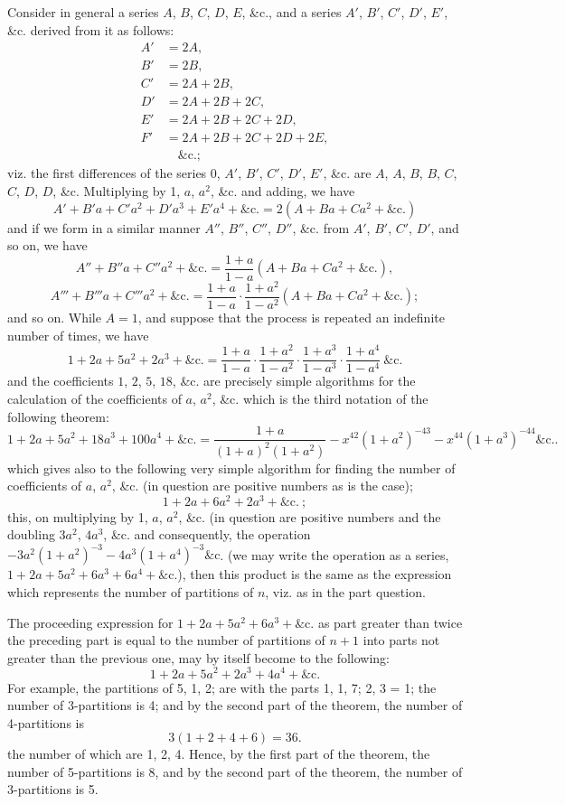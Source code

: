 \documentclass[12pt,a4paper]{article}
\theoremstyle{definition}
\begin{document}
Consider in general a series $A$, $B$, $C$, $D$, $E$, \&c., and a series $A'$, $B'$, $C'$, $D'$, $E'$,
\&c. derived from it as follows:
\begin{align*}
A' &= 2A,\\
B' &= 2B,\\
C' &= 2A + 2B,\\
D' &= 2A + 2B + 2C,\\
E' &= 2A + 2B + 2C + 2D,\\
F' &= 2A + 2B + 2C + 2D + 2E,\\
&\quad\&\textrm{c.};
\end{align*}
viz. the first differences of the series 0, $A'$, $B'$, $C'$, $D'$, $E'$, \&c. are $A$, $A$, $B$, $B$, $C$, $C$, $D$, $D$,
\&c. Multiplying by 1, $a$, $a^2$, \&c. and adding, we have
\[
A' + B' a + C' a^2 + D' a^3 + E' a^4 + \&\textrm{c.} = 2(A + Ba + Ca^2 + \&\textrm{c.})
\]
and if we form in a similar manner $A''$, $B''$, $C''$, $D''$, \&c. from $A'$, $B'$, $C'$, $D'$, and
so on, we have
\[
A'' + B'' a + C'' a^2 + \&\textrm{c.} = \frac{1 + a}{1 - a}(A + Ba + Ca^2 + \&\textrm{c.}),
\]
\[
A''' + B''' a + C''' a^2 + \&\textrm{c.} = \frac{1 + a}{1 - a}\cdot\frac{1 + a^2}{1 - a^2}(A + Ba + Ca^2 + \&\textrm{c.});
\]
and so on. While $A = 1$, and suppose that the process is repeated an indefinite
number of times, we have
\[
1 + 2a + 5a^2 + 2a^3 + \&\textrm{c.} = \frac{1 + a}{1 - a}\cdot\frac{1 + a^2}{1 - a^2}\cdot\frac{1 + a^3}{1 - a^3}\cdot\frac{1 + a^4}{1 - a^4}\ \&\textrm{c.}
\]
and the coefficients $1$, $2$, $5$, $18$, \&c. are precisely simple algorithms for the calculation of the
coefficients of $a$, $a^2$, \&c. which is the third notation of the following theorem:
\[
1 + 2a + 5a^2 + 18a^3 + 100a^4 + \&\textrm{c.} = \frac{1 + a}{(1 + a)^2 (1 + a^2)} - x^{42}(1 + a^2)^{-43} - x^{44}(1 + a^3)^{-44}\&\textrm{c.}.
\]
which gives also to the following very simple algorithm for finding the number of
coefficients of $a$, $a^2$, \&c. (in question are positive numbers as is the case);
\[
1 + 2a + 6a^2 + 2a^3 + \&\textrm{c.}\ ;
\]
this, on multiplying by 1, $a$, $a^2$, \&c. (in question are positive numbers and the doubling
$3a^2$, $4a^3$, \&c. and consequently, the operation $-3a^2(1 + a^2)^{-3} - 4a^3(1 + a^4)^{-3}\&\textrm{c}$. (we may write the
operation as a series, $1 + 2a + 5a^2 + 6a^3 + 6a^4 + \&\textrm{c}$.), then this product is the same as the
expression which represents the number of partitions of $n$, viz. as in the part question.

The proceeding expression for $1 + 2a + 5a^2 + 6a^3 + \&\textrm{c}$. as part greater than twice
the preceding part is equal to the number of partitions of $n + 1$ into parts not
greater than the previous one, may by itself become to the following:
\[
1 + 2a + 5a^2 + 2a^3 + 4a^4 + \&\textrm{c}.
\]
For example, the partitions of 5, 1, 2; are with the parts 1, 1, 7; 2, 3 = 1; the
number of 3-partitions is 4; and by the second part of the theorem, the number of
4-partitions is
\[
3(1 + 2 + 4 + 6) = 36.
\]
the number of which are 1, 2, 4. Hence, by the first part of the theorem, the
number of 5-partitions is 8, and by the second part of the theorem, the number of
3-partitions is 5.
\end{document}
